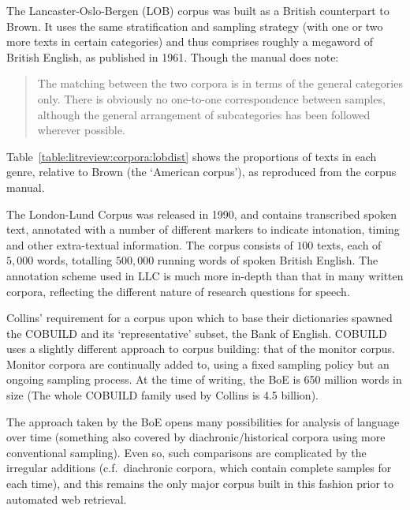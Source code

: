 The Lancaster-Oslo-Bergen (LOB) corpus\cite{johansson1986tagged} was built as a British counterpart to Brown.  
It uses the same stratification and sampling strategy (with one or two more texts in certain categories) and thus comprises roughly a megaword of British English, as published in 1961.  %
Though the manual does note:

\begin{quote}
    The matching between the two corpora is in terms of the general categories only. There is obviously no one-to-one correspondence between samples, although the general arrangement of subcategories has been followed wherever possible.
\end{quote}

Table~\ref{table:litreview:corpora:lobdist} shows the proportions of texts in each genre, relative to Brown (the `American corpus'), as reproduced from the corpus manual.

The London-Lund Corpus\cite{greenbaum1990london} was released in 1990, and contains transcribed spoken text, annotated with a number of different markers to indicate intonation, timing and other extra-textual information.  
The corpus consists of $100$ texts, each of $5,000$ words, totalling $500,000$ running words of spoken British English.
The annotation scheme used in LLC is much more in-depth than that in many written corpora, reflecting the different nature of research questions for speech.



Collins' requirement for a corpus upon which to base their dictionaries spawned the COBUILD and its `representative' subset, the Bank of English\cite{Jarvinen1994AMW991886.991985,sinclair1987looking}.  COBUILD uses a slightly different approach to corpus building: that of the monitor corpus.  Monitor corpora are continually added to, using a fixed sampling policy but an ongoing sampling process.  At the time of writing, the BoE is 650 million words in size (The whole COBUILD family used by Collins is 4.5 billion)\cite{collinswebcorpus}.

The approach taken by the BoE opens many possibilities for analysis of language over time (something also covered by diachronic/historical corpora using more conventional sampling).  Even so, such comparisons are complicated by the irregular additions (c.f.\ diachronic corpora, which contain complete samples for each time), and this remains the only major corpus built in this fashion prior to automated web retrieval.


